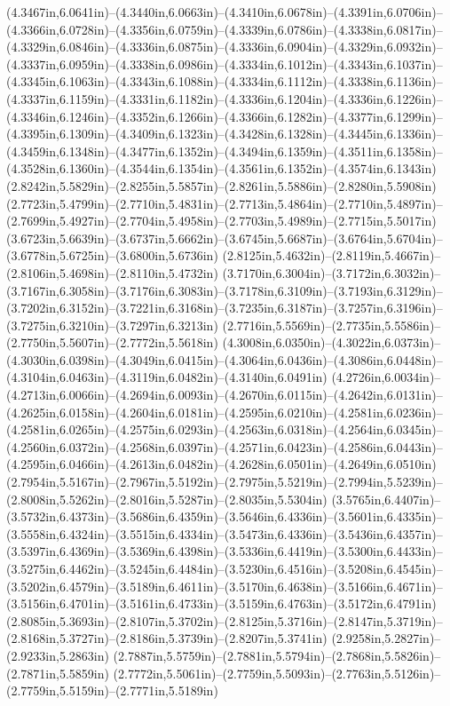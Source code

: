 (4.3467in,6.0641in)--(4.3440in,6.0663in)--(4.3410in,6.0678in)--(4.3391in,6.0706in)--(4.3366in,6.0728in)--(4.3356in,6.0759in)--(4.3339in,6.0786in)--(4.3338in,6.0817in)--(4.3329in,6.0846in)--(4.3336in,6.0875in)--(4.3336in,6.0904in)--(4.3329in,6.0932in)--(4.3337in,6.0959in)--(4.3338in,6.0986in)--(4.3334in,6.1012in)--(4.3343in,6.1037in)--(4.3345in,6.1063in)--(4.3343in,6.1088in)--(4.3334in,6.1112in)--(4.3338in,6.1136in)--(4.3337in,6.1159in)--(4.3331in,6.1182in)--(4.3336in,6.1204in)--(4.3336in,6.1226in)--(4.3346in,6.1246in)--(4.3352in,6.1266in)--(4.3366in,6.1282in)--(4.3377in,6.1299in)--(4.3395in,6.1309in)--(4.3409in,6.1323in)--(4.3428in,6.1328in)--(4.3445in,6.1336in)--(4.3459in,6.1348in)--(4.3477in,6.1352in)--(4.3494in,6.1359in)--(4.3511in,6.1358in)--(4.3528in,6.1360in)--(4.3544in,6.1354in)--(4.3561in,6.1352in)--(4.3574in,6.1343in) (2.8242in,5.5829in)--(2.8255in,5.5857in)--(2.8261in,5.5886in)--(2.8280in,5.5908in) (2.7723in,5.4799in)--(2.7710in,5.4831in)--(2.7713in,5.4864in)--(2.7710in,5.4897in)--(2.7699in,5.4927in)--(2.7704in,5.4958in)--(2.7703in,5.4989in)--(2.7715in,5.5017in) (3.6723in,5.6639in)--(3.6737in,5.6662in)--(3.6745in,5.6687in)--(3.6764in,5.6704in)--(3.6778in,5.6725in)--(3.6800in,5.6736in) (2.8125in,5.4632in)--(2.8119in,5.4667in)--(2.8106in,5.4698in)--(2.8110in,5.4732in) (3.7170in,6.3004in)--(3.7172in,6.3032in)--(3.7167in,6.3058in)--(3.7176in,6.3083in)--(3.7178in,6.3109in)--(3.7193in,6.3129in)--(3.7202in,6.3152in)--(3.7221in,6.3168in)--(3.7235in,6.3187in)--(3.7257in,6.3196in)--(3.7275in,6.3210in)--(3.7297in,6.3213in) (2.7716in,5.5569in)--(2.7735in,5.5586in)--(2.7750in,5.5607in)--(2.7772in,5.5618in) (4.3008in,6.0350in)--(4.3022in,6.0373in)--(4.3030in,6.0398in)--(4.3049in,6.0415in)--(4.3064in,6.0436in)--(4.3086in,6.0448in)--(4.3104in,6.0463in)--(4.3119in,6.0482in)--(4.3140in,6.0491in) (4.2726in,6.0034in)--(4.2713in,6.0066in)--(4.2694in,6.0093in)--(4.2670in,6.0115in)--(4.2642in,6.0131in)--(4.2625in,6.0158in)--(4.2604in,6.0181in)--(4.2595in,6.0210in)--(4.2581in,6.0236in)--(4.2581in,6.0265in)--(4.2575in,6.0293in)--(4.2563in,6.0318in)--(4.2564in,6.0345in)--(4.2560in,6.0372in)--(4.2568in,6.0397in)--(4.2571in,6.0423in)--(4.2586in,6.0443in)--(4.2595in,6.0466in)--(4.2613in,6.0482in)--(4.2628in,6.0501in)--(4.2649in,6.0510in) (2.7954in,5.5167in)--(2.7967in,5.5192in)--(2.7975in,5.5219in)--(2.7994in,5.5239in)--(2.8008in,5.5262in)--(2.8016in,5.5287in)--(2.8035in,5.5304in) (3.5765in,6.4407in)--(3.5732in,6.4373in)--(3.5686in,6.4359in)--(3.5646in,6.4336in)--(3.5601in,6.4335in)--(3.5558in,6.4324in)--(3.5515in,6.4334in)--(3.5473in,6.4336in)--(3.5436in,6.4357in)--(3.5397in,6.4369in)--(3.5369in,6.4398in)--(3.5336in,6.4419in)--(3.5300in,6.4433in)--(3.5275in,6.4462in)--(3.5245in,6.4484in)--(3.5230in,6.4516in)--(3.5208in,6.4545in)--(3.5202in,6.4579in)--(3.5189in,6.4611in)--(3.5170in,6.4638in)--(3.5166in,6.4671in)--(3.5156in,6.4701in)--(3.5161in,6.4733in)--(3.5159in,6.4763in)--(3.5172in,6.4791in) (2.8085in,5.3693in)--(2.8107in,5.3702in)--(2.8125in,5.3716in)--(2.8147in,5.3719in)--(2.8168in,5.3727in)--(2.8186in,5.3739in)--(2.8207in,5.3741in) (2.9258in,5.2827in)--(2.9233in,5.2863in) (2.7887in,5.5759in)--(2.7881in,5.5794in)--(2.7868in,5.5826in)--(2.7871in,5.5859in) (2.7772in,5.5061in)--(2.7759in,5.5093in)--(2.7763in,5.5126in)--(2.7759in,5.5159in)--(2.7771in,5.5189in) 
